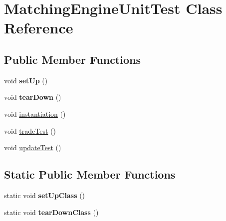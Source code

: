 \hypertarget{class_matching_engine_unit_test}{\section{Matching\+Engine\+Unit\+Test Class Reference}
\label{class_matching_engine_unit_test}
}
\subsection*{Public Member Functions}
\begin{DoxyCompactItemize}
\item 
\hypertarget{class_matching_engine_unit_test_a2fe9413d67e2ad0c8233d11d1f209548}{void {\bfseries set\+Up} ()}\label{class_matching_engine_unit_test_a2fe9413d67e2ad0c8233d11d1f209548}

\item 
\hypertarget{class_matching_engine_unit_test_adececd49e895e978d85a27b8470104d3}{void {\bfseries tear\+Down} ()}\label{class_matching_engine_unit_test_adececd49e895e978d85a27b8470104d3}

\item 
void \hyperlink{class_matching_engine_unit_test_acbb8d543a15e349d8f46769388fd28bd}{instantiation} ()
\item 
void \hyperlink{class_matching_engine_unit_test_a2dbbdf5632bac8d35d6902caf5556c5f}{trade\+Test} ()
\item 
void \hyperlink{class_matching_engine_unit_test_a914f15f54087d84798e02b33734a9791}{update\+Test} ()
\end{DoxyCompactItemize}
\subsection*{Static Public Member Functions}
\begin{DoxyCompactItemize}
\item 
\hypertarget{class_matching_engine_unit_test_a35f673f5cdf8f8282686a1f84ee2dd37}{static void {\bfseries set\+Up\+Class} ()}\label{class_matching_engine_unit_test_a35f673f5cdf8f8282686a1f84ee2dd37}

\item 
\hypertarget{class_matching_engine_unit_test_a0fb23de300ffd3a7d2b42e84d457be09}{static void {\bfseries tear\+Down\+Class} ()}\label{class_matching_engine_unit_test_a0fb23de300ffd3a7d2b42e84d457be09}

\end{DoxyCompactItemize}


